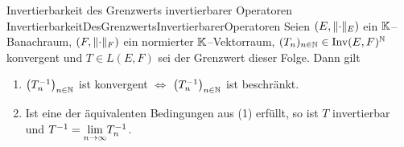 \begin{lemma}{Invertierbarkeit des Grenzwerts invertierbarer Operatoren}
             {InvertierbarkeitDesGrenzwertsInvertierbarerOperatoren}
Seien $(E, \lVert\cdot\rVert_E)$ ein $\mathbb{K}$--Banachraum, $(F, \lVert\cdot\rVert_F)$ ein
normierter $\mathbb{K}$--Vektorraum, $(T_{n})_{n \in \mathbb{N}} \in \mathop{\textrm{Inv}}\nolimits(E, F)^{\mathbb{N}}$ konvergent
und $T \in L(E, F)$ sei der Grenzwert dieser Folge. 
Dann gilt
\begin{enumerate}[(1)]
 \item\label{InvertierbarkeitDesGrenzwertsInvertierbarerOperatoren1}
 $\left(T_n^{-1}\right)_{n \in \mathbb{N}}$ ist konvergent $\iff$
 $\left(T_n^{-1}\right)_{n \in \mathbb{N}}$ ist beschränkt.
 \item\label{InvertierbarkeitDesGrenzwertsInvertierbarerOperatoren2}
 Ist eine der äquivalenten Bedingungen aus (1) erfüllt, so ist
 $T$ invertierbar und $T^{-1} = \underset{n\to \infty}{\lim} T_n^{-1}$.
\end{enumerate}
\end{lemma}
